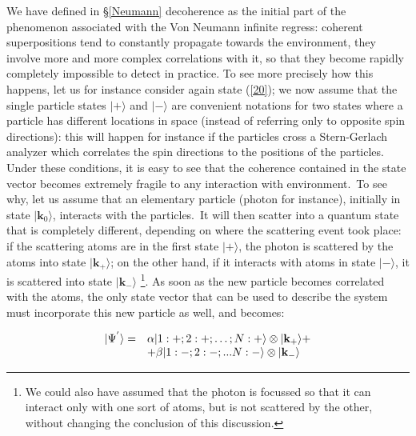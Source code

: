 \documentclass[12pt,onecolumn]{article}%
\begin{document}
We have defined in \S \ref{Neumann} decoherence as the initial part of the
phenomenon associated with the Von Neumann infinite regress: coherent
superpositions tend to constantly propagate towards the environment, they
involve more and more complex correlations with it, so that they become
rapidly completely impossible to detect in practice. To see more precisely how
this happens, let us for instance consider again state (\ref{20}); we now
assume that the single particle states $|+\rangle $ and $|-\rangle $ are convenient
notations for two states where a particle has different locations in space
(instead of referring only to opposite spin directions): this will happen for
instance if the particles cross a Stern-Gerlach analyzer which correlates the
spin directions to the positions of the particles. Under these conditions, it
is easy to see that the coherence contained in the state vector becomes
extremely fragile to any interaction with environment.\ To see why, let us
assume that an elementary particle (photon for instance), initially in state
$|\mathbf{k}_{0}\rangle$, interacts with the particles.\ It will then scatter
into a quantum state that is completely different, depending on where the
scattering event took place: if the scattering atoms are in the first state
$|+\rangle $, the photon is scattered by the atoms into state $|\mathbf{k}%
_{+}\rangle$; on the other hand, if it interacts with atoms in state $|-\rangle $, it is
scattered into state $|\mathbf{k}_{-}\rangle$ \footnote{We could also have
assumed that the photon is focussed so that it can interact only with one sort
of atoms, but is not scattered by the other, without changing the conclusion
of this discussion.}. As soon as the new particle becomes correlated with the
atoms, the only state vector that can be used to describe the system must
incorporate this new particle as well, and becomes:%

\begin{equation}%
\begin{array}
[c]{cl}%
|\Psi^{^{\prime}}\rangle = & \alpha|1:+;2:+;\ldots ;N:+\rangle \otimes|\mathbf{k}%
_{+}\rangle +\\
& +\beta|1:-;2:-;...N:-\rangle \otimes|\mathbf{k}_{-}\rangle
\end{array}
\label{23}%
\end{equation}
\end{document}
